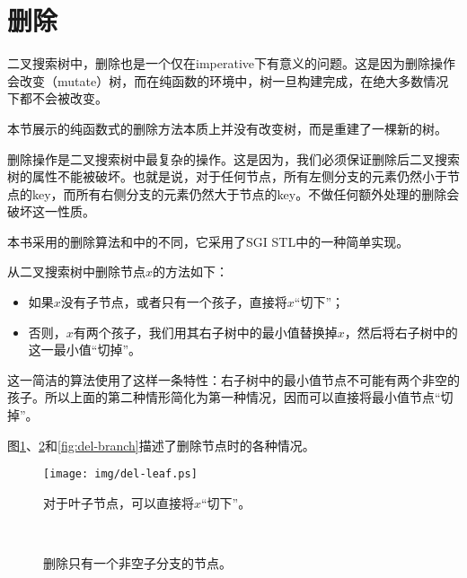 \documentclass[UTF8]{article}
\begin{document}
\section{删除}
二叉搜索树中，删除也是一个仅在imperative下有意义的问题。这是因为删除操作会改变（mutate）树，而在纯函数的环境中，树一旦构建完成，在绝大多数情况下都不会被改变。

本节展示的纯函数式的删除方法本质上并没有改变树，而是重建了一棵新的树。

删除操作是二叉搜索树中最复杂的操作。这是因为，我们必须保证删除后二叉搜索树的属性不能被破坏。也就是说，对于任何节点，所有左侧分支的元素仍然小于节点的key，而所有右侧分支的元素仍然大于节点的key。不做任何额外处理的删除会破坏这一性质。

本书采用的删除算法和\cite{CLRS}中的不同，它采用了SGI STL中的一种简单实现\cite{sgi-stl}。

从二叉搜索树中删除节点$x$的方法如下：
\begin{itemize}
\item 如果$x$没有子节点，或者只有一个孩子，直接将$x$“切下”；
\item 否则，$x$有两个孩子，我们用其右子树中的最小值替换掉$x$，然后将右子树中的这一最小值“切掉”。
\end{itemize}

这一简洁的算法使用了这样一条特性：右子树中的最小值节点不可能有两个非空的孩子。所以上面的第二种情形简化为第一种情况，因而可以直接将最小值节点“切掉”。

图\ref{fig:del-leaf}、\ref{fig:del-1child}和\ref{fig:del-branch}描述了删除节点时的各种情况。

\begin{figure}[htbp]
  \centering
  \texttt{[image: img/del-leaf.ps]}
  \caption{对于叶子节点，可以直接将$x$“切下”。} \label{fig:del-leaf}
\end{figure}

\begin{figure}[htbp]
  \centering
   \\
  \caption{删除只有一个非空子分支的节点。}
  \label{fig:del-1child}
\end{figure}
\end{document}
